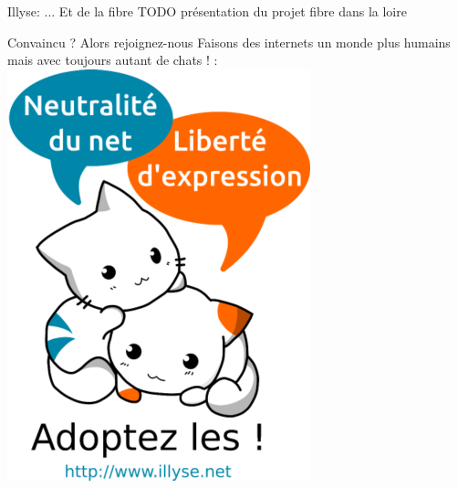 \begin{frame}{Illyse: \hfill ... Et de la fibre}
  TODO présentation du projet fibre dans la loire
\end{frame}

\begin{frame}{Convaincu ? Alors rejoignez-nous}
  Faisons des internets un monde plus humains mais avec toujours autant de chats !
:
  \includegraphics[height=0.7\textheight]{un_autre_internet/adoptez_les.png}
\end{frame}

